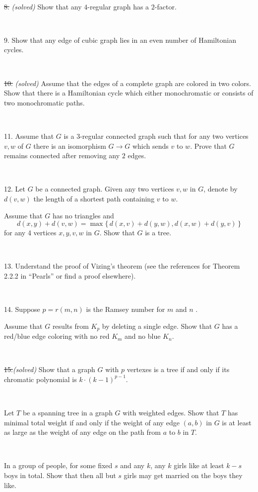\documentclass[oneside,a4paper]{article}
\begin{document}
\ 


\noindent \sout
{8.} \textit{(solved)} %
Show that any $4$-regular graph has a $2$-factor.

\ 


\noindent %
{9.} %
Show that any edge of cubic graph lies in an even number of Hamiltonian cycles.


\ 

\noindent \sout
{10.} \textit{(solved)} 
Assume that the edges of a complete graph are colored in two colors.
Show that there is a Hamiltonian cycle which either monochromatic or consists of two monochromatic paths.

\ 

\noindent %
{11.}  %
Assume that $G$ is a $3$-regular connected graph such that 
for any two vertices $v,w$ of $G$ there is an isomorphism
$G\to G$ which sends $v$ to $w$.
Prove that $G$ remains connected after removing any $2$ edges.

\ 


\noindent %
{12.} %
Let $G$ be a connected graph.
Given any two vertices $v,w$ in $G$, denote by $d(v,w)$ the length of a shortest path containing $v$ to $w$. 

Assume that $G$ has no triangles and
\[d(x,y)+d(v,w)=\max\{\,d(x,v)+d(y,w),d(x,w)+d(y,v)\,\}\]
for any 4 vertices $x,y,v,w$ in $G$.
Show that $G$ is a tree.

\ 

\noindent %
{13.} %
Understand the proof of Vizing's theorem (see the references for Theorem 2.2.2 in ``Pearls'' or find a proof elsewhere).

\ 

\noindent %
{14.} %
Suppose $p=r(m,n)$ is the Ramsey number for $m$ and $n$%
.

Assume that $G$ results from $K_p$ by deleting a single edge.
Show that $G$ has a red/blue edge coloring with no red
$K_m$ and no blue $K_n$.

\ 

\noindent \sout{15.}\textit{(solved)} Show that a graph $G$ with $p$ vertexes is a tree if and only if
its chromatic polynomial is $k\cdot(k-1)^{p-1}$.

\ 

 Let $T$ be a spanning tree in a graph $G$ with weighted edges.
Show that $T$ has minimal total weight if and only if the weight of any edge $(a,b)$ in $G$ is at least as large as the weight of any edge on the path from $a$ to $b$ in $T$. 

\ 

 In a group of people, for some fixed $s$ and any $k$,
any $k$ girls like at least $k-s$ boys in total.
Show that then all but $s$ girls may get married on the boys they like.
\end{document}

